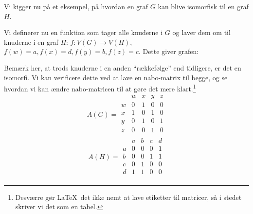 \begin{example}
	Vi kigger nu på et eksempel, på hvordan en graf $G$ kan blive isomorfisk til en graf $H$.

	\begin{center}
	\end{center}

	Vi definerer nu en funktion som tager alle knuderne i $G$ og laver dem om til knuderne i en graf $H$: $f : V(G) \rightarrow V(H)$, $f(w) = a, f(x) = d, f(y) = b, f(z) = c$.
	Dette giver grafen:
	\begin{center}
	\end{center}
	Bemærk her, at trods knuderne i en anden ``rækkefølge'' end tidligere, er det en isomorfi. Vi kan verificere dette ved at lave en nabo-matrix til begge, og se hvordan vi kan ændre nabo-matricen til at gøre det mere klart.\footnote{Desværre gør \LaTeX\ det ikke nemt at lave etiketter til matricer, så i stedet skriver vi det som en tabel.}
	\begin{equation}
		A(G) =
		\begin{array}{c|cccc}
			  & w & x & y & z \\
			\hline
			w & 0 & 1 & 0 & 0 \\
			x & 1 & 0 & 1 & 0 \\
			y & 0 & 1 & 0 & 1 \\
			z & 0 & 0 & 1 & 0 \\
		\end{array}
	\end{equation}
	\begin{equation}
		A(H) =
		\begin{array}{c|cccc}
			  & a & b & c & d \\
			\hline
			a & 0 & 0 & 0 & 1 \\
			b & 0 & 0 & 1 & 1 \\
			c & 0 & 1 & 0 & 0 \\
			d & 1 & 1 & 0 & 0 \\
		\end{array}

\end{equation}
\end{example}
